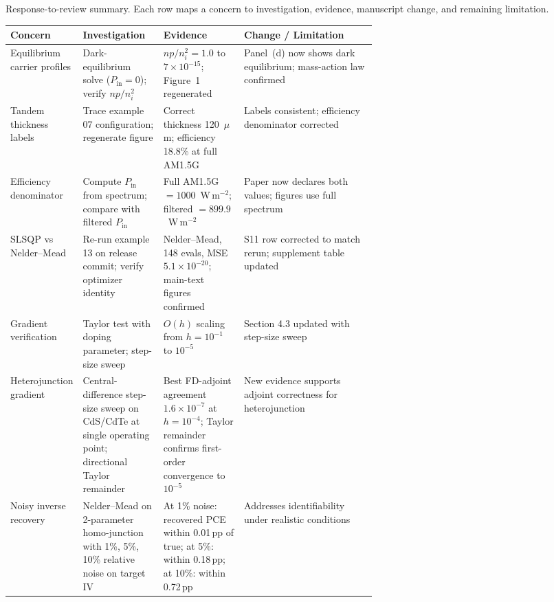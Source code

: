 \documentclass[11pt,a4paper]{article}
\numberwithin{equation}{section}
\begin{document}
\begin{papertable}
\centering\small
\caption{Response-to-review summary. Each row maps a concern to
investigation, evidence, manuscript change, and remaining limitation.}
\label{tab:response}
\small
\begin{tabularx}{\linewidth}{@{}>{\raggedright\arraybackslash}p{0.18\linewidth}
>{\raggedright\arraybackslash}p{0.22\linewidth}
>{\raggedright\arraybackslash}p{0.22\linewidth}
>{\raggedright\arraybackslash}X@{}}
\toprule
Concern & Investigation & Evidence & Change / Limitation \\
\midrule
Equilibrium carrier profiles & Dark-equilibrium solve ($P_{\mathrm{in}}=0$);
verify $np/n_i^2$ & $np/n_i^2=1.0$ to $7\times10^{-15}$; Figure~1
regenerated & Panel~(d) now shows dark equilibrium; mass-action law
confirmed \\
\addlinespace
Tandem thickness labels & Trace example 07 configuration; regenerate figure
& Correct thickness 120~$\mu$m; efficiency 18.8\% at full AM1.5G &
Labels consistent; efficiency denominator corrected \\
\addlinespace
Efficiency denominator & Compute $P_{\mathrm{in}}$ from spectrum; compare
with filtered $P_{\mathrm{in}}$ & Full AM1.5G $=1000$~W\,m$^{-2}$;
filtered $=899.9$~W\,m$^{-2}$ & Paper now declares both values; figures
use full spectrum \\
\addlinespace
SLSQP vs Nelder--Mead & Re-run example 13 on release commit; verify
optimizer identity & Nelder--Mead, 148 evals, MSE
$5.1\times10^{-20}$; main-text figures confirmed &
S11 row corrected to match rerun; supplement table updated \\
\addlinespace
Gradient verification & Taylor test with doping parameter; step-size sweep &
$O(h)$ scaling from $h=10^{-1}$ to $10^{-5}$ & Section 4.3 updated with
step-size sweep \\
\addlinespace
Heterojunction gradient & Central-difference step-size sweep on CdS/CdTe
at single operating point; directional Taylor remainder & Best FD-adjoint
agreement $1.6\times10^{-7}$ at $h{=}10^{-4}$; Taylor remainder
confirms first-order convergence to $10^{-5}$ & New evidence supports
adjoint correctness for heterojunction \\
\addlinespace
Noisy inverse recovery & Nelder--Mead on 2-parameter homo-junction with
1\%, 5\%, 10\% relative noise on target IV & At 1\% noise: recovered
PCE within 0.01\,pp of true; at 5\%: within 0.18\,pp; at 10\%: within
0.72\,pp & Addresses identifiability under realistic conditions \\

\end{tabularx}
\end{papertable}
\end{document}
